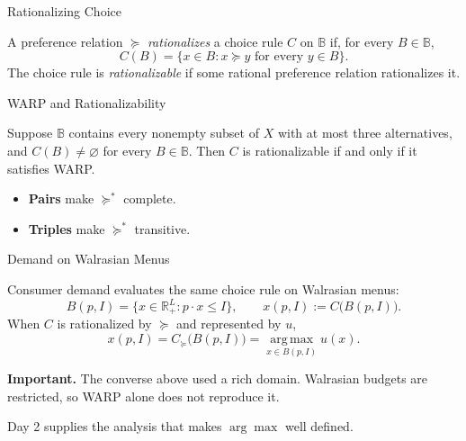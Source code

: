 \documentclass[11pt,aspectratio=169,c]{beamer}
\begin{document}
\begin{frame}{Rationalizing Choice}
\begin{definitionbox}[Rationalization]
A preference relation $\succeq$ \emph{rationalizes} a choice rule $C$ on
$\mathbb B$ if, for every $B\in\mathbb B$,
\[
C(B)=\{x\in B:x\succeq y\text{ for every }y\in B\}.
\]
The choice rule is \emph{rationalizable} if some rational preference relation
rationalizes it.
\end{definitionbox}

\end{frame}

\begin{frame}{WARP and Rationalizability}
\begin{theorembox}
Suppose $\mathbb B$ contains every nonempty subset of $X$ with at most three
alternatives, and $C(B)\neq\varnothing$ for every $B\in\mathbb B$. Then $C$ is
rationalizable if and only if it satisfies WARP.
\end{theorembox}

\begin{itemize}
    \item \textbf{Pairs} make $\succeq^*$ complete.
    \item \textbf{Triples} make $\succeq^*$ transitive.
\end{itemize}
\end{frame}

\begin{frame}{Demand on Walrasian Menus}
\begin{definitionbox}
Consumer demand evaluates the same choice rule on Walrasian menus:
\[
B(p,I)=\{x\in\mathbb{R}_+^L:p\cdot x\leq I\},
\qquad
x(p,I):=C\bigl(B(p,I)\bigr).
\]
When $C$ is rationalized by $\succeq$ and represented by $u$,
\[
x(p,I)
=C_{\succeq}\bigl(B(p,I)\bigr)
=\operatorname*{arg\,max}_{x\in B(p,I)}u(x).
\]
\end{definitionbox}

\vspace{.25em}
\textbf{Important.}\quad
The converse above used a rich domain. Walrasian budgets are restricted, so
WARP alone does not reproduce it.

\vspace{.35em}
\centering
Day 2 supplies the analysis that makes $\arg\max$ well defined.
\end{frame}
\end{document}
